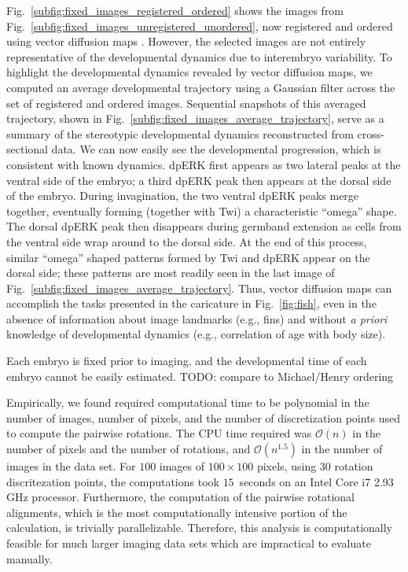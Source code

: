 \documentclass{pnastwo}
\newcommand{\fig}[0]{Fig.}
\begin{document}
\begin{article}
\fig~\ref{subfig:fixed_images_registered_ordered} shows the images from \fig~\ref{subfig:fixed_images_unregistered_unordered}, now registered and ordered using vector diffusion maps \cite{singer2012vector}.
%
However,  the selected images are not entirely representative of the developmental dynamics due to interembryo variability. 
%
To highlight the developmental dynamics revealed by vector diffusion maps, we computed an average developmental trajectory using a Gaussian filter across the set of registered and ordered images. 
%
Sequential snapshots of this averaged trajectory, shown in \fig~\ref{subfig:fixed_images_average_trajectory}, serve as a summary of the stereotypic developmental dynamics reconstructed from cross-sectional data.
%
We can now easily see the developmental progression, which is consistent with known dynamics. 
%
dpERK first appears as two lateral peaks at the ventral side of the embryo; a third dpERK peak then appears at the dorsal side of the embryo.
%
During invagination, the two ventral dpERK peaks merge together, eventually forming (together with Twi) a characteristic ``omega'' shape.
%
The dorsal dpERK peak then disappears during germband extension as cells from the ventral side wrap around to the dorsal side.
%
At the end of this process, similar ``omega'' shaped patterns formed by Twi and dpERK appear on the dorsal side; these patterns are most readily seen in the last image of \fig~\ref{subfig:fixed_images_average_trajectory}.
%
Thus, vector diffusion maps can accomplish the tasks presented in the caricature in \fig~\ref{fig:fish}, even in the absence of information about image landmarks (e.g., fins) and without {\it a priori} knowledge of developmental dynamics (e.g., correlation of age with body size).

Each embryo is fixed prior to imaging, and the developmental time of each embryo cannot be easily estimated.
%
TODO: compare to Michael/Henry ordering

Empirically, we found required computational time to be polynomial in the number of images, number of pixels, and the number of discretization points used to compute the pairwise rotations. 
%
The CPU time required was $\mathcal{O}(n)$ in the number of pixels and the number of rotations, and $\mathcal{O}(n^{1.5})$ in the number of images in the data set.
%
For $100$ images of $100 \times 100$ pixels, using $30$ rotation discritezation points, the computations took $15$~seconds on an Intel Core i7 2.93 GHz processor. 
%
Furthermore, the computation of the pairwise rotational alignments, which is the most computationally intensive portion of the calculation, is trivially parallelizable.
%
Therefore, this analysis is computationally feasible for much larger imaging data sets which are impractical to evaluate manually. 


\end{article}
\end{document}
